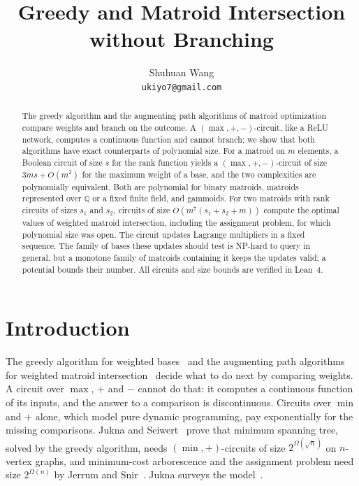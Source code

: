 \documentclass[11pt]{article}
\title{Greedy and Matroid Intersection\\without Branching}
\author{Shuhuan Wang\\{\small\texttt{ukiyo7@gmail.com}}}
\date{}
\begin{document}
\maketitle

\begin{abstract}
The greedy algorithm and the augmenting path algorithms of matroid optimization
compare weights and branch on the outcome.  A $(\max,+,-)$-circuit, like a ReLU
network, computes a continuous function and cannot branch; we show that both
algorithms have exact counterparts of polynomial size.  For a matroid on $m$
elements, a Boolean circuit of size $s$ for the rank function yields a
$(\max,+,-)$-circuit of size $3ms+O(m^{2})$ for the maximum weight of a base, and
the two complexities are polynomially equivalent.  Both are polynomial for binary
matroids, matroids represented over $\mathbb Q$ or a fixed finite field, and
gammoids.  For two matroids with rank circuits of sizes $s_1$ and $s_2$, circuits
of size $O(m^{7}(s_1+s_2+m))$ compute the optimal values of weighted matroid
intersection, including the assignment problem, for which polynomial size was
open.  The circuit updates Lagrange multipliers in a fixed sequence.  The family
of bases these updates should test is NP-hard to query in general, but a
monotone family of matroids containing it keeps the updates valid; a potential
bounds their number.  All circuits and size bounds are verified in Lean~4.
\end{abstract}

\section{Introduction}
\label{sec:intro}

The greedy algorithm for weighted bases~\cite{edmonds71} and the augmenting path
algorithms for weighted matroid
intersection~\cite{edmonds70,lawler75,frank81} decide what to do next by
comparing weights.  A circuit over $\max$, $+$ and $-$ cannot do that: it
computes a continuous function of its inputs, and the answer to a comparison is
discontinuous.  Circuits over $\min$ and $+$ alone, which model pure dynamic
programming, pay exponentially for the missing comparisons.  Jukna and
Seiwert~\cite{jukna-seiwert18-greedy} prove that minimum spanning tree, solved by
the greedy algorithm, needs $(\min,+)$-circuits of size $2^{\Omega(\sqrt n)}$ on
$n$-vertex graphs, and minimum-cost arborescence and the assignment problem need
size $2^{\Omega(n)}$ by Jerrum and Snir~\cite{jerrum-snir82}.  Jukna surveys the
model~\cite{jukna15-tropical,jukna23-tropical}.
\end{document}
